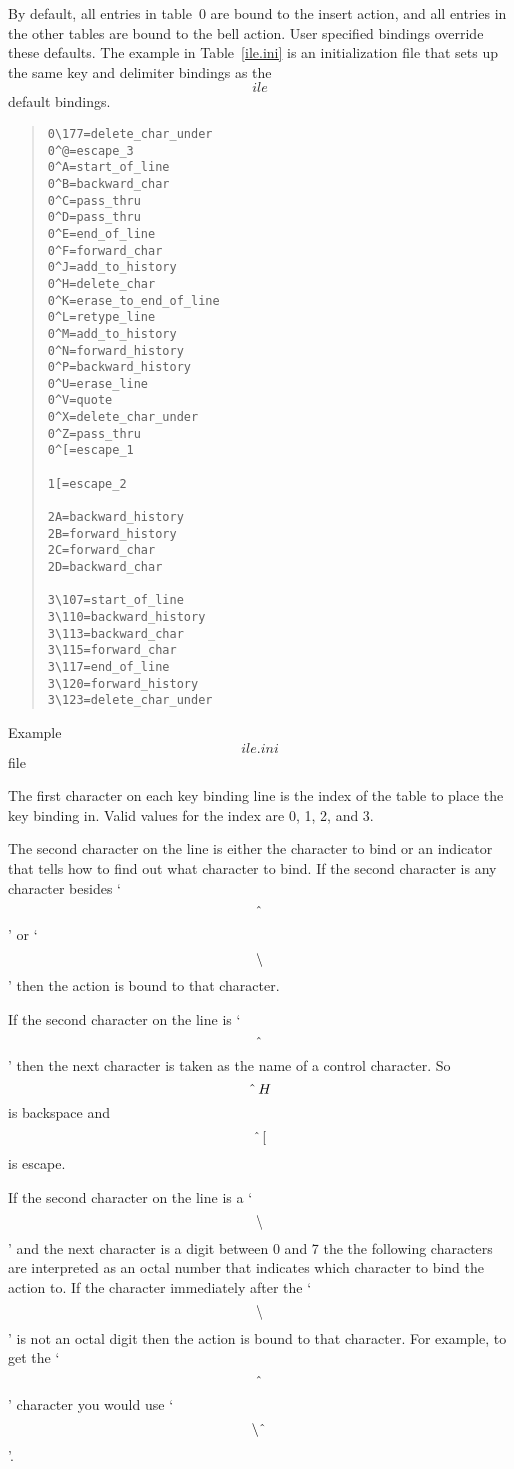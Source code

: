      By default, all entries in table~0 are bound to  the  insert
     action, and all entries in the other tables are bound to the
     bell  action.  User  specified   bindings	 override   these
     defaults.	The example in Table~\ref{ile.ini} is an initialization file
     that sets up the same key and delimiter bindings as the  \[ile\]
     default bindings.


\begin{table}
\begin{quote}\begin{verbatim}
0\177=delete_char_under
0^@=escape_3
0^A=start_of_line
0^B=backward_char
0^C=pass_thru
0^D=pass_thru
0^E=end_of_line
0^F=forward_char
0^J=add_to_history
0^H=delete_char
0^K=erase_to_end_of_line
0^L=retype_line
0^M=add_to_history
0^N=forward_history
0^P=backward_history
0^U=erase_line
0^V=quote
0^X=delete_char_under
0^Z=pass_thru
0^[=escape_1

1[=escape_2

2A=backward_history
2B=forward_history
2C=forward_char
2D=backward_char

3\107=start_of_line
3\110=backward_history
3\113=backward_char
3\115=forward_char
3\117=end_of_line
3\120=forward_history
3\123=delete_char_under
\end{verbatim}\end{quote}
\caption{Example \[ile.ini\] file\label{ile.ini}}
\end{table}

     The first character on each key binding line is the index of
     the  table to place the key binding in. Valid values for the
     index are 0, 1, 2, and 3.

     The second character on the line is either the character to bind
     or an indicator that tells how to find out what character to
     bind.  If the second character is any	character besides
     `\[\mbox{\^\,} \]'
     or `\[\mbox{$\backslash$}\]' then the action is bound to that character.

     If the second character on the line is  `\[\mbox{\^\,} \]'  then
     the  next
     character is taken as the name of a control character. So
     \[\mbox{\^\,} H\]
     is backspace and \[\mbox{\^\,} [\] is escape.

     If the second character on the line is a `\[\mbox{$\backslash$}\]' and	the
     next character is a digit between 0 and 7 the the following
     characters are interpreted as an octal number that	indicates
     which character to bind	 the action to. If the character
     immediately after the `\[\mbox{$\backslash$}\]' is not an octal	 digit	then the
     action is	 bound to that character. For example, to get the
     `\[\mbox{\^\,} \]'
     character you would use `\[\mbox{$\backslash$}\mbox{\^\,} \]'.

